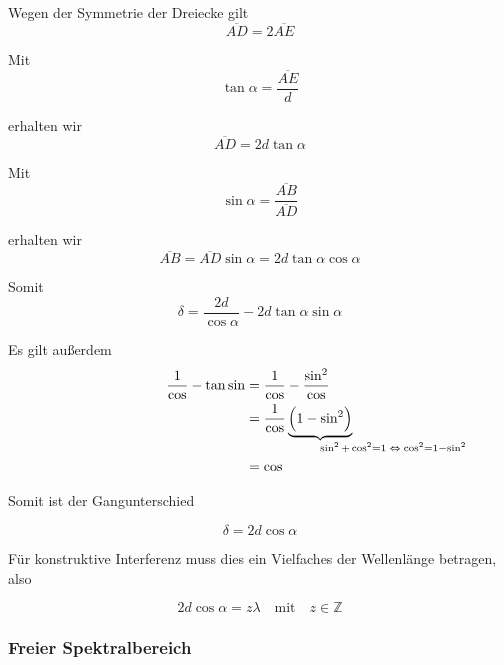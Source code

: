 \documentclass[a4paper,german,12pt,smallheadings]{scrartcl}
\begin{document}
Wegen der Symmetrie der Dreiecke gilt
\begin{equation}
  \overline{AD} = 2 \overline{AE}
\end{equation}

Mit
\begin{equation}
  \tan \alpha = \frac{\overline{AE}}{d}
\end{equation}

erhalten wir
\begin{equation}
  \overline{AD} = 2 d \tan \alpha
\end{equation}

Mit
\begin{equation}
  \sin \alpha = \frac{\overline{AB}}{\overline{AD}}
\end{equation}

erhalten wir
\begin{equation}
  \overline{AB} = \overline{AD} \sin \alpha = 2d \tan \alpha \cos \alpha
\end{equation}

Somit
\begin{equation}
  \delta = \frac{2d}{\cos \alpha} - 2d \tan \alpha \sin \alpha
\end{equation}

Es gilt außerdem
\begin{align*}
  \frac{1}{\cos} - \tan \sin &= \frac{1}{\cos} - \frac{\sin^2}{\cos} \\
                             &= \frac{1}{\cos} \underbrace{\del{1-\sin^2}}_{\mathrlap{\sin^2 + \cos^2 = 1 \; \Leftrightarrow \; \cos^2 = 1 - \sin^2}} \\
                             &= \cos
\end{align*}

Somit ist der Gangunterschied

\begin{equation}
  \delta = 2d \cos \alpha
\end{equation}

Für konstruktive Interferenz muss dies ein Vielfaches der Wellenlänge betragen,
also

\begin{equation}
  2d \cos \alpha = z \lambda \quad \text{mit} \quad z \in \mathbb{Z}
\end{equation}

\subsubsection{Freier Spektralbereich}
\end{document}
